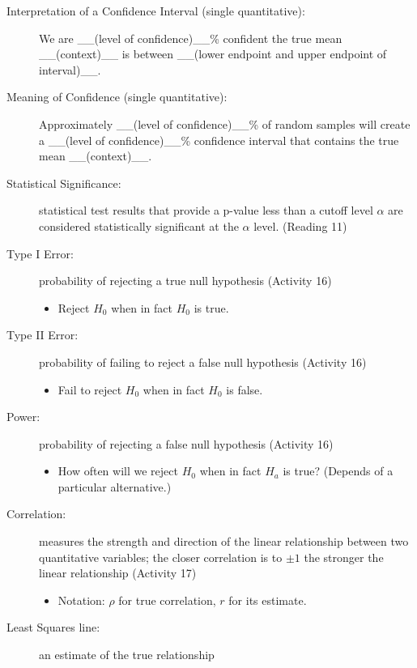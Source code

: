 \begin{description}
     \item [Interpretation of a Confidence Interval (single quantitative):]
       We are \_\_(level of confidence)\_\_\%  confident the true mean
       \_\_(context)\_\_  is between \_\_(lower endpoint and upper
       endpoint of interval)\_\_.
     \item [Meaning of Confidence (single quantitative):]
       Approximately \_\_(level of confidence)\_\_\% of random samples
       will create a \_\_(level of confidence)\_\_\% confidence
       interval that contains the true mean \_\_(context)\_\_.
     \item [Statistical Significance:] statistical test results that
       provide a p-value less than a cutoff level $\alpha$ are considered
       statistically significant at the $\alpha$ level. (Reading 11) 
     \item [Type I Error:]  probability of rejecting a true null
       hypothesis (Activity 16)
       \begin{itemize}
       \item Reject $H_0$  when in fact $H_0$ is true.
       \end{itemize}
     \item [Type II Error:]  probability of failing to reject a false
       null hypothesis (Activity 16) 
       \begin{itemize}
       \item Fail to reject $H_0$  when in fact $H_0$ is false.
       \end{itemize}
     \item [Power:] probability of rejecting a false null hypothesis
       (Activity 16) 
       \begin{itemize}
       \item How often will we reject $H_0$ when in fact $H_a$ is
         true? (Depends of a particular alternative.)
       \end{itemize}
     \item [Correlation:] measures the strength and direction of the
       linear relationship between two quantitative variables; the
       closer correlation is to $\pm 1$ the stronger the linear
       relationship (Activity 17)
       \begin{itemize}
       \item Notation: $\rho$ for true correlation, $r$ for its estimate.
       \end{itemize}
     \item [Least Squares line:] an estimate of the true relationship

\end{description}

